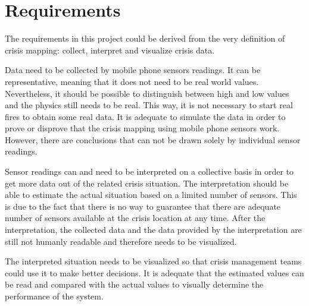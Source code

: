 \section{Requirements}
The requirements in this project could be derived from the very definition of crisis mapping: collect, interpret and visualize crisis data.

Data need to be collected by mobile phone sensors readings. It can be representative, meaning that it does not need to be real world values. Nevertheless, it should be possible to distinguish between high and low values and the physics still needs to be real. This way, it is not necessary to start real fires to obtain some real data. It is adequate to simulate the data in order to prove or disprove that the crisis mapping using mobile phone sensors work. However, there are conclusions that can not be drawn solely by individual sensor readings.

Sensor readings can and need to be interpreted on a collective basis in order to get more data out of the related crisis situation. The interpretation should be able to estimate the actual situation based on a limited number of sensors. This is due to the fact that there is no way to guarantee that there are adequate number of sensors available at the crisis location at any time. After the interpretation, the collected data and the data provided by the interpretation are still not humanly readable and therefore needs to be visualized.

The interpreted situation needs to be visualized so that crisis management teams could use it to make better decisions. It is adequate that the estimated values can be read and compared with the actual values to visually determine the performance of the system.